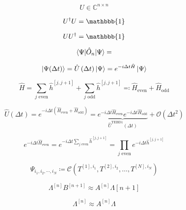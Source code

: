 \documentclass{article}
\newcommand{\id}{\mathbbb{1}}
\begin{document}
	\begin{equation}
	U\in\mathbb{C}^{n\times n}
	\end{equation}
	
	\begin{equation}
	U^\dagger U=\id
	\end{equation}
	
	\begin{equation}
	UU^\dagger = \id
	\end{equation}
	
	\begin{equation}
	\braket{\Psi|\hat{O}_n|\Psi} =
	\end{equation}
	
	\begin{equation}
	\ket{\Psi(\Delta t)} = \hat{U}\left(\Delta t\right) \ket{\Psi} = e^{-i\Delta t\hat{H}} \ket{\Psi}
	\end{equation}
	
	\begin{equation}
	\hat{H} = \sum_{j \text{ even}}\hat{h}^{[j, j+1]} + \sum_{j \text{ odd}}\hat{h}^{[j, j+1]} \eqqcolon \hat{H}_\text{even} + \hat{H}_\text{odd}
	\end{equation}
	
	\begin{equation}
	\hat{U}(\Delta t) = e^{-i\Delta t\left(\hat{H}_\text{even} + \hat{H}_\text{odd}\right)} = \underbrace{e^{-i\Delta t\hat{H}_\text{even}}e^{-i\Delta t\hat{H}_\text{odd}}}_{\hat{U}^\text{TEBD1}(\Delta t)} + \mathcal{O}\left(\Delta t^2\right)
	\end{equation}
	
	\begin{equation}
		e^{-i\Delta t\hat{H}_\text{even}} = e^{-i\Delta t\sum_{j \text{ even}} \hat{h}^{[j, j+1]}} = \prod_{j \text{ even}} e^{-i\Delta t \hat{h}^{[j, j+1]}}
	\end{equation}
	
	\begin{equation}
	\Psi_{i_1,i_2,\cdots,i_N} \coloneqq \mathcal{C}\left(T^{[1],i_1}, T^{[2],i_2}, \dots, T^{[N],i_N}\right)
	\end{equation}
	
	\begin{equation}
	\Lambda^{[n]}B^{[n+1]} \approx A^{[n]}\Lambda{[n+1]}
	\end{equation}
	
	\begin{equation}
	\Lambda^{[n]} \approx A^{[n]} \Lambda
	\end{equation}
	
\end{document}
